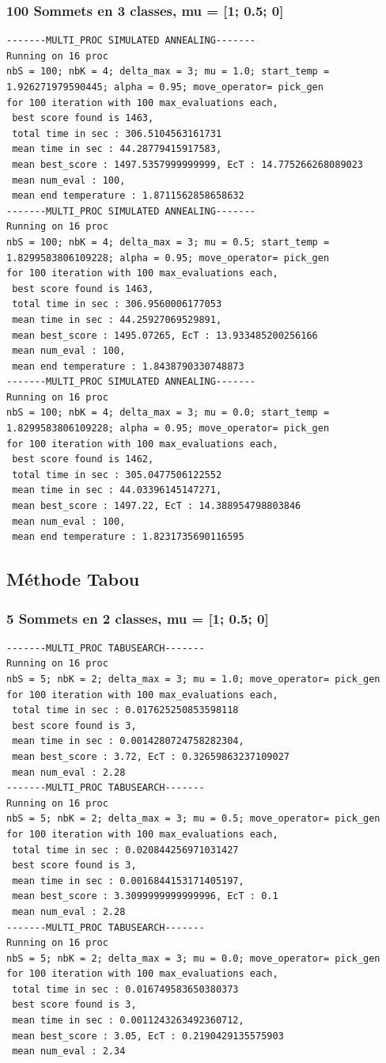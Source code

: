 \documentclass[a4paper]{article}
\begin{document}
\subsubsection{100 Sommets en 3 classes, mu = [1; 0.5; 0]}
\begin{verbatim}
-------MULTI_PROC SIMULATED ANNEALING-------
Running on 16 proc
nbS = 100; nbK = 4; delta_max = 3; mu = 1.0; start_temp = 1.926271979590445; alpha = 0.95; move_operator= pick_gen
for 100 iteration with 100 max_evaluations each, 
 best score found is 1463,
 total time in sec : 306.5104563161731
 mean time in sec : 44.28779415917583,
 mean best_score : 1497.5357999999999, EcT : 14.775266268089023
 mean num_eval : 100,
 mean end temperature : 1.8711562858658632
-------MULTI_PROC SIMULATED ANNEALING-------
Running on 16 proc
nbS = 100; nbK = 4; delta_max = 3; mu = 0.5; start_temp = 1.8299583806109228; alpha = 0.95; move_operator= pick_gen
for 100 iteration with 100 max_evaluations each, 
 best score found is 1463,
 total time in sec : 306.9560006177053
 mean time in sec : 44.25927069529891,
 mean best_score : 1495.07265, EcT : 13.933485200256166
 mean num_eval : 100,
 mean end temperature : 1.8438790330748873
-------MULTI_PROC SIMULATED ANNEALING-------
Running on 16 proc
nbS = 100; nbK = 4; delta_max = 3; mu = 0.0; start_temp = 1.8299583806109228; alpha = 0.95; move_operator= pick_gen
for 100 iteration with 100 max_evaluations each, 
 best score found is 1462,
 total time in sec : 305.0477506122552
 mean time in sec : 44.03396145147271,
 mean best_score : 1497.22, EcT : 14.388954798803846
 mean num_eval : 100,
 mean end temperature : 1.8231735690116595
\end{verbatim}

\subsection{Méthode Tabou}
\subsubsection{5 Sommets en 2 classes, mu = [1; 0.5; 0]}
\begin{verbatim}
-------MULTI_PROC TABUSEARCH-------
Running on 16 proc
nbS = 5; nbK = 2; delta_max = 3; mu = 1.0; move_operator= pick_gen
for 100 iteration with 100 max_evaluations each, 
 total time in sec : 0.017625250853598118
 best score found is 3,
 mean time in sec : 0.0014280724758282304,
 mean best_score : 3.72, EcT : 0.32659863237109027
 mean num_eval : 2.28
-------MULTI_PROC TABUSEARCH-------
Running on 16 proc
nbS = 5; nbK = 2; delta_max = 3; mu = 0.5; move_operator= pick_gen
for 100 iteration with 100 max_evaluations each, 
 total time in sec : 0.020844256971031427
 best score found is 3,
 mean time in sec : 0.0016844153171405197,
 mean best_score : 3.3099999999999996, EcT : 0.1
 mean num_eval : 2.28
-------MULTI_PROC TABUSEARCH-------
Running on 16 proc
nbS = 5; nbK = 2; delta_max = 3; mu = 0.0; move_operator= pick_gen
for 100 iteration with 100 max_evaluations each, 
 total time in sec : 0.016749583650380373
 best score found is 3,
 mean time in sec : 0.0011243263492360712,
 mean best_score : 3.05, EcT : 0.2190429135575903
 mean num_eval : 2.34
\end{verbatim}
\end{document}
